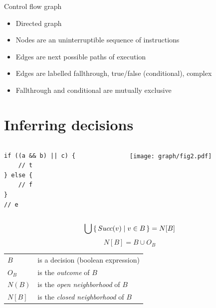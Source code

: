 \documentclass[xcolor = {dvipsnames, table}]{beamer}
\begin{document}
\begin{frame}
    Control flow graph

    \begin{itemize}
        \item Directed graph
        \item Nodes are an uninterruptible sequence of instructions
        \item Edges are next possible paths of execution
        \item Edges are labelled fallthrough, true/false (conditional), complex
        \item Fallthrough and conditional are mutually exclusive
    \end{itemize}
\end{frame}

\section{Inferring decisions}
\begin{frame}[fragile]
    \begin{columns}
        \begin{column}{0.4\textwidth}
            \begin{lstlisting}[basicstyle = \footnotesize\ttfamily]
if ((a && b) || c) {
    // t
} else {
    // f
}
// e
            \end{lstlisting}
        \end{column}
        \begin{column}{0.4\textwidth}
            \texttt{[image: graph/fig2.pdf]}
        \end{column}
    \end{columns}
\end{frame}

\begin{frame}
    \begin{equation*}
        \bigcup \set{Succ(v) \mid v \in B} = N[B]
    \end{equation*}
    \begin{equation*}
        N[B] = B \cup O_B
    \end{equation*}

    \begin{tabular}{l l}
        $B$    & is a decision (boolean expression) \\
        $O_B$  & is the \emph{outcome} of $B$ \\
        $N(B)$ & is the \emph{open neighborhood} of $B$ \\
        $N[B]$ & is the \emph{closed neighborhood} of $B$ \\
    \end{tabular}
\end{frame}
\end{document}
